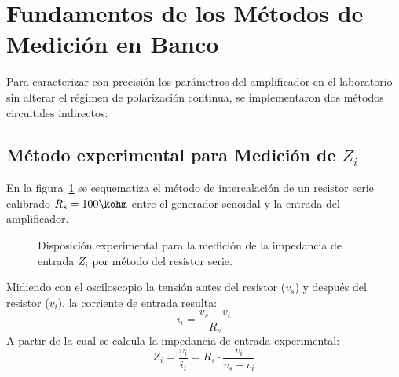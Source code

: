 \begin{table}[!ht]
  \centering
  \caption{Comparación de parámetros dinámicos de pequeña señal teóricos y con componentes normalizados.}
  \label{tab:resumen_pequena_senal}
\end{table}

\section{Fundamentos de los Métodos de Medición en Banco}

Para caracterizar con precisión los parámetros del amplificador en el laboratorio sin alterar el régimen de polarización
continua, se implementaron dos métodos circuitales indirectos:

\subsection{Método experimental para Medición de \texorpdfstring{$Z_i$}{Zi}}
En la figura~\ref{crkt:medicion_zi} se esquematiza el método de intercalación de un resistor serie calibrado
$R_s = 100\kohm$ entre el generador senoidal y la entrada del amplificador.

\begin{figure}[!ht]
  \centering
  
  \caption{Disposición experimental para la medición de la impedancia de entrada $Z_i$ por método del resistor serie.}
  \label{crkt:medicion_zi}
\end{figure}

Midiendo con el osciloscopio la tensión antes del resistor ($v_s$) y después del resistor ($v_i$), la corriente de
entrada resulta:
\begin{equation}
  i_i = \frac{v_s - v_i}{R_s}
  \label{eq:ii_medicion}
\end{equation}
A partir de la cual se calcula la impedancia de entrada experimental:
\begin{equation}
  Z_i = \frac{v_i}{i_i} = R_s \cdot \frac{v_i}{v_s - v_i}
  \label{eq:Zi_medicion}
\end{equation}

